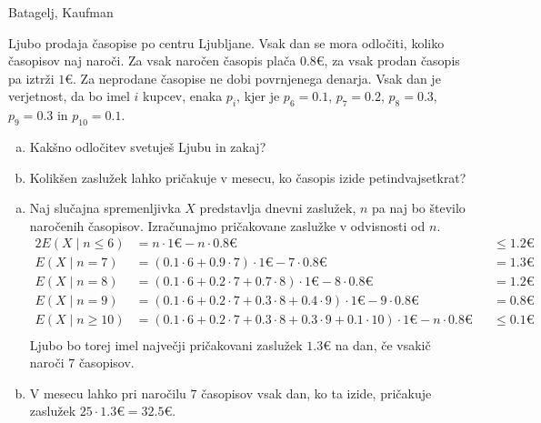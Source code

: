 \begin{naloga}{Batagelj, Kaufman}{\cite[Naloga~4.3]{bk}}
\begin{vprasanje}
Ljubo prodaja časopise po centru Ljubljane.
Vsak dan se mora odločiti, koliko časopisov naj naroči.
Za vsak naročen časopis plača $0.8 €$,
za vsak prodan časopis pa iztrži $1 €$.
Za neprodane časopise ne dobi povrnjenega denarja.
Vsak dan je verjetnost, da bo imel $i$ kupcev, enaka $p_i$,
kjer je $p_6 = 0.1$, $p_7 = 0.2$, $p_8 = 0.3$, $p_9 = 0.3$ in $p_{10} = 0.1$.
\begin{enumerate}[(a)]
\item Kakšno odločitev svetuješ Ljubu in zakaj?
\item Kolikšen zaslužek lahko pričakuje v mesecu,
ko časopis izide petindvajsetkrat?
\end{enumerate}
\end{vprasanje}

\begin{odgovor}
\begin{enumerate}[(a)]
\item Naj slučajna spremenljivka $X$ predstavlja dnevni zaslužek,
$n$ pa naj bo število naročenih časopisov.
Izračunajmo pričakovane zaslužke v odvisnosti od $n$.
\begin{alignat*}{2}
E(X \mid n \le 6) &= n \cdot 1 € - n \cdot 0.8 € &&\le 1.2 € \\
E(X \mid n = 7) &= (0.1 \cdot 6 + 0.9 \cdot 7) \cdot 1 €
    - 7 \cdot 0.8 € &&= 1.3 € \\
E(X \mid n = 8) &= (0.1 \cdot 6 + 0.2 \cdot 7 + 0.7 \cdot 8) \cdot 1 €
    - 8 \cdot 0.8 € &&= 1.2 € \\
E(X \mid n = 9) &= (0.1 \cdot 6 + 0.2 \cdot 7 + 0.3 \cdot 8 + 0.4 \cdot 9)
    \cdot 1 € - 9 \cdot 0.8 € &&= 0.8 € \\
E(X \mid n \ge 10) &= (0.1 \cdot 6 + 0.2 \cdot 7 + 0.3 \cdot 8 + 0.3 \cdot 9
    + 0.1 \cdot 10) \cdot 1 € - n \cdot 0.8 € &&\le 0.1 € \\
\end{alignat*}
Ljubo bo torej imel največji pričakovani zaslužek $1.3 €$ na dan,
če vsakič naroči $7$ časopisov.

\item V mesecu lahko pri naročilu $7$ časopisov vsak dan, ko ta izide,
pričakuje zaslužek $25 \cdot 1.3 € = 32.5 €$.
\end{enumerate}
\end{odgovor}
\end{naloga}
